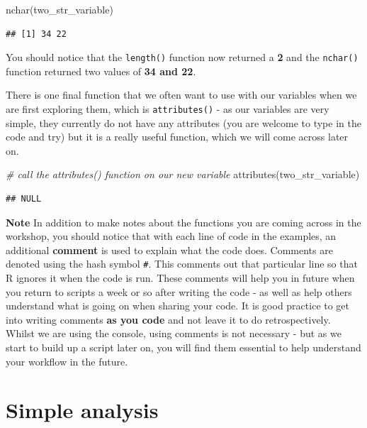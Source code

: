 \documentclass[
]{book}
\newenvironment{Shaded}{\begin{snugshade}}{\end{snugshade}}
\newcommand{\CommentTok}[1]{\textcolor[rgb]{0.56,0.35,0.01}{\textit{#1}}}
\newcommand{\FunctionTok}[1]{\textcolor[rgb]{0.00,0.00,0.00}{#1}}
\newcommand{\NormalTok}[1]{#1}
\begin{document}
\begin{Shaded}
\begin{Highlighting}[]
\FunctionTok{nchar}\NormalTok{(two\_str\_variable)}
\end{Highlighting}
\end{Shaded}

\begin{verbatim}
## [1] 34 22
\end{verbatim}

You should notice that the \texttt{length()} function now returned a \textbf{2} and the \texttt{nchar()} function returned two values of \textbf{34 and 22}.

There is one final function that we often want to use with our variables when we are first exploring them, which is \texttt{attributes()} - as our variables are very simple, they currently do not have any attributes (you are welcome to type in the code and try) but it is a really useful function, which we will come across later on.

\begin{Shaded}
\begin{Highlighting}[]
\CommentTok{\# call the attributes() function on our new variable}
\FunctionTok{attributes}\NormalTok{(two\_str\_variable)}
\end{Highlighting}
\end{Shaded}

\begin{verbatim}
## NULL
\end{verbatim}

\textbf{Note}
In addition to make notes about the functions you are coming across in the workshop, you should notice that with each line of code in the examples, an additional \textbf{comment} is used to explain what the code does. Comments are denoted using the hash symbol \texttt{\#}. This comments out that particular line so that R ignores it when the code is run. These comments will help you in future when you return to scripts a week or so after writing the code - as well as help others understand what is going on when sharing your code. It is good practice to get into writing comments \textbf{as you code} and not leave it to do retrospectively. Whilst we are using the console, using comments is not necessary - but as we start to build up a script later on, you will find them essential to help understand your workflow in the future.

\hypertarget{simple-analysis}{%
\section{Simple analysis}\label{simple-analysis}}
\end{document}
